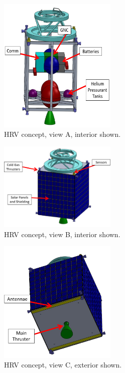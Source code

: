 \documentclass[paper=letter, fontsize=11pt]{scrartcl} %
\numberwithin{equation}{section} %
\numberwithin{figure}{section} %
\numberwithin{table}{section} %
\begin{document}
\begin{figure}[H]
    \begin{center}
    \includegraphics[width=0.5\textwidth]{Pics/2.png}
    \caption{HRV concept, view A, interior shown.}
    \label{fig:p2}
    \end{center}
\end{figure}

\begin{figure}[H]
    \begin{center}
    \includegraphics[width=0.5\textwidth]{Pics/3.png}
    \caption{HRV concept, view B, interior shown.}
    \label{fig:p3}
    \end{center}
\end{figure}

\begin{figure}[H]
    \begin{center}
    \includegraphics[width=0.5\textwidth]{Pics/4.png}
    \caption{HRV concept, view C, exterior shown.}
    \label{fig:p4}
    \end{center}
\end{figure}
\end{document}
